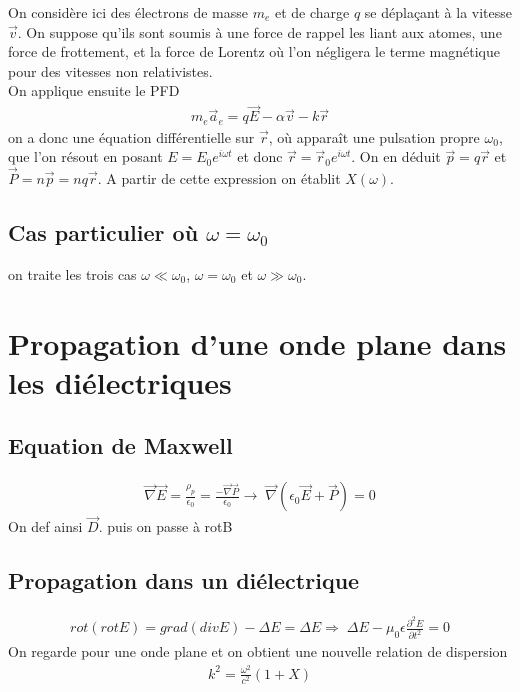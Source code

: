 \documentclass[12pt,prb,aps,epsf]{report}
\begin{document}
On considère ici des électrons de masse $m_e$ et de charge $q$ se déplaçant à la vitesse $\vec{v}$. On suppose qu'ils sont soumis à une force de rappel les liant aux atomes, une force de frottement, et la force de Lorentz où l'on négligera le terme magnétique pour des vitesses non relativistes.\\
On applique ensuite le PFD 
\begin{eqnarray}
m_e\vec{a}_e = q\vec{E} - \alpha \vec{v} - k\vec{r}
\end{eqnarray}
on a donc une équation différentielle sur $\vec{r}$, où apparaît une pulsation propre $\omega_0$, que l'on résout  en posant $E = E_0e^{i\omega t}$ et donc $\vec{r} = \vec{r}_0 e^{i\omega t}$. On en déduit $\vec{p}=q\vec{r}$ et $\vec{P} = n\vec{p} = nq\vec{r}$. A partir de cette expression on établit $X(\omega)$.

\subsection{Cas particulier où $\omega = \omega_0$}
on traite les trois cas $\omega \ll \omega_0$, $\omega = \omega_0$ et $\omega\gg\omega_0$.

\section{Propagation d'une onde plane dans les diélectriques}
\subsection{Equation de Maxwell }
\begin{eqnarray}
\vec{\nabla}\vec{E} = \frac{\rho_p}{\epsilon_0} = \frac{-\vec{\nabla}\vec{P}}{\epsilon_0} \rightarrow\; \vec{\nabla}(\epsilon_0\vec{E}+\vec{P}) = 0
\end{eqnarray}
On def ainsi $\vec{D}$. puis on passe à rotB

\subsection{Propagation dans un diélectrique}

\begin{eqnarray}
rot(rotE)=grad(divE)-\Delta E = \Delta E \Rightarrow\; \Delta E - \mu_0\epsilon\frac{\partial^2E}{\partial t^2} = 0
\end{eqnarray}
On regarde pour une onde plane et on obtient une nouvelle relation de dispersion 
\begin{eqnarray}
k^2 = \frac{\omega^2}{c^2}(1+X)
\end{eqnarray}
\end{document}
